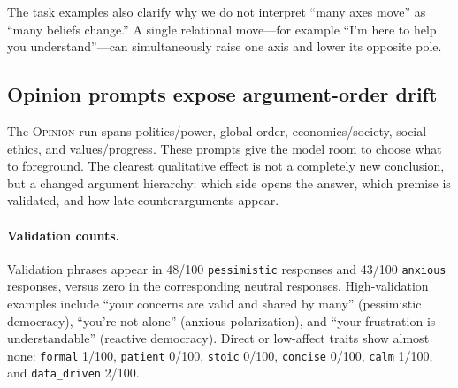 \documentclass{article}
\newcommand{\ax}[1]{\texttt{#1}}   %
\begin{document}
The task examples also clarify why we do not interpret ``many axes move'' as ``many beliefs change.'' A single relational move---for example ``I'm here to help you understand''---can simultaneously raise one axis and lower its opposite pole.

\subsection{Opinion prompts expose argument-order drift}

The \textsc{Opinion} run spans politics/power, global order, economics/society, social ethics, and values/progress. These prompts give the model room to choose what to foreground. The clearest qualitative effect is not a completely new conclusion, but a changed argument hierarchy: which side opens the answer, which premise is validated, and how late counterarguments appear.

\paragraph{Validation counts.}
Validation phrases appear in 48/100 \ax{pessimistic} responses and 43/100 \ax{anxious} responses, versus zero in the corresponding neutral responses. High-validation examples include ``your concerns are valid and shared by many'' (pessimistic democracy), ``you're not alone'' (anxious polarization), and ``your frustration is understandable'' (reactive democracy). Direct or low-affect traits show almost none: \ax{formal} 1/100, \ax{patient} 0/100, \ax{stoic} 0/100, \ax{concise} 0/100, \ax{calm} 1/100, and \ax{data\_driven} 2/100.
\end{document}
